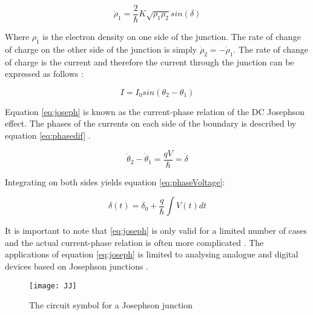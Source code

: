 \begin{equation}
    \dot\rho_1 = \frac{2}{\hbar}K\sqrt{\rho_1\rho_2}sin(\delta)
    \label{eq:charge_dens}
\end{equation}

Where $\rho_1$ is the electron density on one side of the junction. The rate of change of charge on the other side of the junction is simply $\dot\rho_2 = -\dot\rho_1$\cite{Feynman_Leighton_Sands_2013}. The rate of change of charge is the current and therefore the current through the junction can be expressed as follows \cite{CPRJJ}:

\begin{equation}
    I = I_0sin(\theta_2 - \theta_1)
    \label{eq:joseph}
\end{equation}

Equation \ref{eq:joseph} is known as the current-phase relation of the DC Josephson effect.
The phases of the currents on each side of the boundary is described by equation \ref{eq:phasedif} \cite{Feynman_Leighton_Sands_2013}.

\begin{equation}
    \dot\theta_2 - \dot\theta_1 = \frac{qV}{\hbar} = \dot\delta
    \label{eq:phasedif}
\end{equation}

Integrating on both sides yields equation \ref{eq:phaseVoltage}:

\begin{equation}
    \delta(t) = \delta_0 + \frac{q}{\hbar}\int V(t) dt
    \label{eq:phaseVoltage}
\end{equation}

It is important to note that \ref{eq:joseph} is only valid for a limited number of cases and the actual current-phase relation is often more complicated \cite{CPRJJ}. The applications of equation \ref{eq:joseph} is limited to analysing analogue and digital devices based on Josephson junctions \cite{CPRJJ}.

\begin{figure}[h]
    \centering
    \texttt{[image: JJ]}
    \label{fig:JJ}
    \caption{The circuit symbol for a Josephson junction}
\end{figure}
